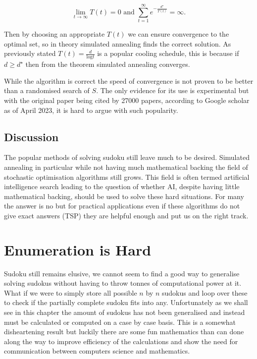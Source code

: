 \documentclass[a4paper,11pt]{report}
\newcounter{row}
\begin{document}
{\begin{equation}\lim_{t\rightarrow\infty}T(t)=0 \text{ and } \sum^\infty_{t=1}e^{-\frac{d^\star}{T(t)}}=\infty.\end{equation} 

Then by choosing an appropriate $T(t)$ we can ensure convergence to the optimal set, so in theory simulated annealing finds the correct solution. As previously stated $T(t)=\frac{d}{\text{log}t}$ is a popular cooling schedule, this is because if $d\geq d^\star$ then from the theorem simulated annealing converges.

While the algorithm is correct the speed of convergence is not proven to be better than a randomised search of $S$. The only evidence for its use is experimental but with the original paper \cite{kirkpatrick1983optimization} being cited by 27000 papers, according to Google scholar as of April 2023, it is hard to argue with such popularity.

\section{Discussion}

The popular methods of solving sudoku still leave much to be desired. Simulated annealing in particular while not having much mathematical backing the field of stochastic optimisation algorithms still grows. This field is often termed artificial intelligence search leading to the question of whether AI, despite having little mathematical backing, should be used to solve these hard situations. For many the answer is no but for practical applications even if these algorithms do not give exact answers (TSP) they are helpful enough and put us on the right track.

\chapter{Enumeration is Hard}

Sudoku still remains elusive, we cannot seem to find a good way to generalise solving sudokus without having to throw tonnes of computational power at it. What if we were to simply store all possible $n$ by $n$ sudokus and loop over these to check if the partially complete sudoku fits into any. Unfortunately as we shall see in this chapter the amount of sudokus has not been generalised and instead must be calculated or computed on a case by case basis. This is a somewhat disheartening result but luckily there are some fun mathematics than can done along the way to improve efficiency of the calculations and show the need for communication between computers science and mathematics.

}
\end{document}
